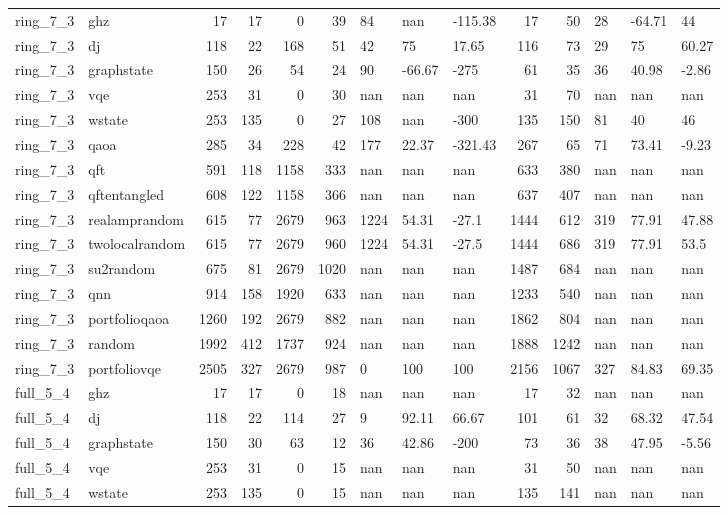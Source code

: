\begin{longtable}{llrrrrlllrrlll}
ring\_7\_3 & ghz & 17 & 17 & 0 & 39 & 84 & nan & -115.38 & 17 & 50 & 28 & -64.71 & 44 \\
ring\_7\_3 & dj & 118 & 22 & 168 & 51 & 42 & 75 & 17.65 & 116 & 73 & 29 & 75 & 60.27 \\
ring\_7\_3 & graphstate & 150 & 26 & 54 & 24 & 90 & -66.67 & -275 & 61 & 35 & 36 & 40.98 & -2.86 \\
ring\_7\_3 & vqe & 253 & 31 & 0 & 30 & nan & nan & nan & 31 & 70 & nan & nan & nan \\
ring\_7\_3 & wstate & 253 & 135 & 0 & 27 & 108 & nan & -300 & 135 & 150 & 81 & 40 & 46 \\
ring\_7\_3 & qaoa & 285 & 34 & 228 & 42 & 177 & 22.37 & -321.43 & 267 & 65 & 71 & 73.41 & -9.23 \\
ring\_7\_3 & qft & 591 & 118 & 1158 & 333 & nan & nan & nan & 633 & 380 & nan & nan & nan \\
ring\_7\_3 & qftentangled & 608 & 122 & 1158 & 366 & nan & nan & nan & 637 & 407 & nan & nan & nan \\
ring\_7\_3 & realamprandom & 615 & 77 & 2679 & 963 & 1224 & 54.31 & -27.1 & 1444 & 612 & 319 & 77.91 & 47.88 \\
ring\_7\_3 & twolocalrandom & 615 & 77 & 2679 & 960 & 1224 & 54.31 & -27.5 & 1444 & 686 & 319 & 77.91 & 53.5 \\
ring\_7\_3 & su2random & 675 & 81 & 2679 & 1020 & nan & nan & nan & 1487 & 684 & nan & nan & nan \\
ring\_7\_3 & qnn & 914 & 158 & 1920 & 633 & nan & nan & nan & 1233 & 540 & nan & nan & nan \\
ring\_7\_3 & portfolioqaoa & 1260 & 192 & 2679 & 882 & nan & nan & nan & 1862 & 804 & nan & nan & nan \\
ring\_7\_3 & random & 1992 & 412 & 1737 & 924 & nan & nan & nan & 1888 & 1242 & nan & nan & nan \\
ring\_7\_3 & portfoliovqe & 2505 & 327 & 2679 & 987 & 0 & 100 & 100 & 2156 & 1067 & 327 & 84.83 & 69.35 \\
full\_5\_4 & ghz & 17 & 17 & 0 & 18 & nan & nan & nan & 17 & 32 & nan & nan & nan \\
full\_5\_4 & dj & 118 & 22 & 114 & 27 & 9 & 92.11 & 66.67 & 101 & 61 & 32 & 68.32 & 47.54 \\
full\_5\_4 & graphstate & 150 & 30 & 63 & 12 & 36 & 42.86 & -200 & 73 & 36 & 38 & 47.95 & -5.56 \\
full\_5\_4 & vqe & 253 & 31 & 0 & 15 & nan & nan & nan & 31 & 50 & nan & nan & nan \\
full\_5\_4 & wstate & 253 & 135 & 0 & 15 & nan & nan & nan & 135 & 141 & nan & nan & nan \\

\end{longtable}
